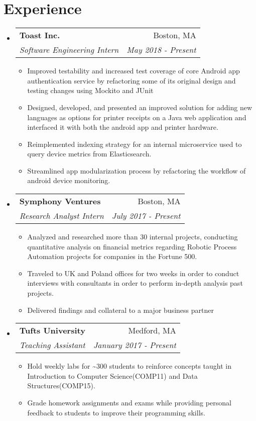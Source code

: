 \documentclass[letterpaper,11pt]{article}
\makeatletter
\newcommand{\resumeItem}[1]{
  \item[{{\textbullet}}]\small{{#1 \vspace{-2pt}}
  }
}
\newcommand{\resumeSubheading}[4]{
  \vspace{-1pt}\item[]
    \begin{tabular*}{0.97\textwidth}{l@{\extracolsep{\fill}}r}
      \textbf{#1} & #2 \\
      \textit{\small#3} & \textit{\small #4} \\
    \end{tabular*}\vspace{-5pt}
}
\newcommand{\resumeSubHeadingListStart}{\begin{itemize}[leftmargin=*]}
\newcommand{\resumeSubHeadingListEnd}{\end{itemize}}
\newcommand{\resumeItemListStart}{\begin{itemize}}
\newcommand{\resumeItemListEnd}{\end{itemize}\vspace{-5pt}}
\makeatother
\begin{document}
\section{Experience}
  \resumeSubHeadingListStart
    \resumeSubheading
      {Toast Inc.}{Boston, MA}
      {Software Engineering Intern}{May 2018 - Present}
      \resumeItemListStart
        \resumeItem
          {Improved testability and increased test coverage of core Android app authentication service by refactoring some of its original design and testing changes using Mockito and JUnit }
        \resumeItem
        {Designed, developed, and presented an improved solution for adding new languages as options for printer receipts on a Java web application and interfaced it with both the android app and printer hardware.}
        \resumeItem
          {Reimplemented indexing strategy for an internal microservice used to query device metrics from Elasticsearch.}
        \resumeItem
          {Streamlined app modularization process by refactoring the workflow of android device monitoring.}

      \resumeItemListEnd

    \resumeSubheading
      {Symphony Ventures}{Boston, MA}
      {Research Analyst Intern}{July 2017 - Present}
      \resumeItemListStart
        \resumeItem
          {Analyzed and researched more than 30 internal projects, conducting quantitative analysis on financial metrics regarding Robotic Process Automation projects for companies in the Fortune 500.}
        \resumeItem
          {Traveled to UK and Poland offices for two weeks in order to conduct interviews with consultants in order to perform in-depth analysis past projects.}
         \resumeItem
          {
            Delivered findings and collateral to a major business partner 
          }
      \resumeItemListEnd


    \resumeSubheading
      {Tufts University}{Medford, MA}
      {Teaching Assistant}{January 2017 - Present}
      \resumeItemListStart
        \resumeItem
          {Hold weekly labs for \textasciitilde300 students to reinforce concepts taught in Introduction to Computer Science(COMP11) and Data Structures(COMP15).}
        \resumeItem
          {Grade homework assignments and exams while providing personal feedback to students to improve their programming skills.}
          
      \resumeItemListEnd


  \resumeSubHeadingListEnd
\end{document}
